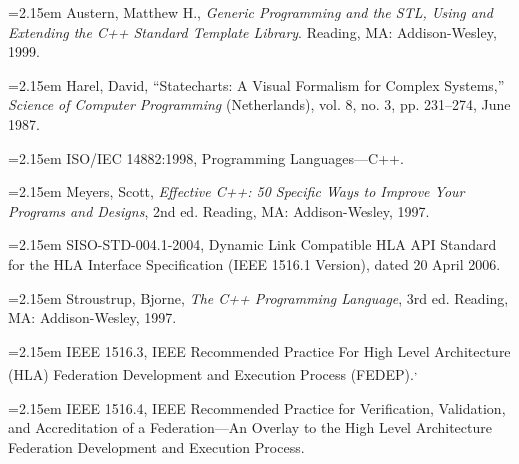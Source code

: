 
\clearpage

\newcommand{\stdannexbibitem}[2]{%
    \par\noindent\hangindent=2.15em\hangafter=1%
    \makebox[2.15em][l]{[#1]}#2\par
}

\begin{annexstdpage}

    \stdannexbibitem{B1}{Austern, Matthew H., \textit{Generic Programming and the STL, Using and Extending the C++ Standard Template Library}. Reading, MA: Addison-Wesley, 1999.}

    \stdannexbibitem{B2}{Harel, David, ``Statecharts: A Visual Formalism for Complex Systems,'' \textit{Science of Computer Programming} (Netherlands), vol. 8, no. 3, pp. 231--274, June 1987.}

    \stdannexbibitem{B3}{ISO/IEC 14882:1998, Programming Languages---C++.}

    \stdannexbibitem{B4}{Meyers, Scott, \textit{Effective C++: 50 Specific Ways to Improve Your Programs and Designs}, 2nd ed. Reading, MA: Addison-Wesley, 1997.}

    \stdannexbibitem{B5}{SISO-STD-004.1-2004, Dynamic Link Compatible HLA API Standard for the HLA Interface Specification (IEEE 1516.1 Version), dated 20 April 2006.}

    \stdannexbibitem{B6}{Stroustrup, Bjorne, \textit{The C++ Programming Language}, 3rd ed. Reading, MA: Addison-Wesley, 1997.}

    \stdannexbibitem{B7}{IEEE 1516.3, IEEE Recommended Practice For High Level Architecture (HLA) Federation Development and Execution Process (FEDEP).\footnotemark[10]\textsuperscript{,}\footnotemark[11]}

    {\sloppy\stdannexbibitem{B8}{IEEE 1516.4, IEEE Recommended Practice for Verification, Validation, and Accreditation of a Federation---An Overlay to the High Level Architecture Federation Development and Execution Process.}}

\end{annexstdpage}

\clearpage

\thispagestyle{body}
\null
